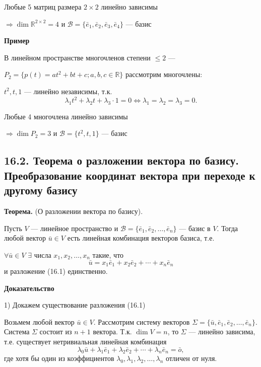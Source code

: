 \documentclass[12pt,a4paper]{article}
\newcommand{\vu}{\bar u}
\newcommand{\ve}{\bar e}
\newcommand{\vo}{\bar o}
\begin{document}
Любые 5 матриц размера $2 \times 2$ линейно зависимы

$\Rightarrow \dim \mathbb{R}^{2\times 2} = 4$ и $\mathcal{B} =
\{\ve_1, \ve_2, \ve_3, \ve_4\}$ --- базис

\textbf{Пример}

В линейном пространстве многочленов степени $\le 2$ ---

$P_2 = \{p(t) = at^2 + bt + c; a, b, c \in \mathbb{R}\}$ рассмотрим многочлены:

$t^2, t, 1$ --- линейно независимы, т.к.
$$
\lambda_1 t^2 + \lambda_2 t + \lambda_3 \cdot 1 = 0 \Leftrightarrow
\lambda_1 = \lambda_2 = \lambda_3 = 0.
$$

Любые 4 многочлена линейно зависимы

$\Rightarrow \dim P_2 = 3$ и $\mathcal{B} = \{t^2, t, 1\}$ --- базис

\subsection*{\textbf{16.2. Теорема о разложении вектора по базису.
Преобразование координат вектора при переходе к другому базису}}

\textbf{Теорема.} (О разложении вектора по базису).

Пусть $V$ --- линейное пространство и $\mathcal{B} = \{\ve_1, \ve_2,
\ldots, \ve_n\}$ --- базис в $V$. Тогда любой вектор $\vu \in V$ есть
линейная комбинация векторов базиса, т.е.

$\forall \vu \in V$ $\exists$ числа $x_1, x_2, \ldots, x_n$ такие, что
\begin{equation}
  \vu = x_1 \ve_1 + x_2 \ve_2 + \cdots + x_n \ve_n \tag{16.1}
\end{equation}
и разложение (16.1) единственно.

\textbf{Доказательство}

1) Докажем существование разложения (16.1)

Возьмем любой вектор $\vu \in V$. Рассмотрим систему векторов $\Sigma
= \{\vu, \ve_1, \ve_2, \ldots, \ve_n\}$. Система $\Sigma$ состоит из
$n + 1$ вектора. Т.к. $\dim V = n$, то $\Sigma$ --- линейно зависима,
т.е. существует нетривиальная линейная комбинация
\begin{equation}
\lambda_0 \vu + \lambda_1 \ve_1 + \lambda_2 \ve_2 + \cdots +
\lambda_n \ve_n = \vo, \tag{16.2}
\end{equation}
где хотя бы один из коэффициентов $\lambda_0, \lambda_1, \lambda_2,
\ldots, \lambda_n$ отличен от нуля.
\end{document}
